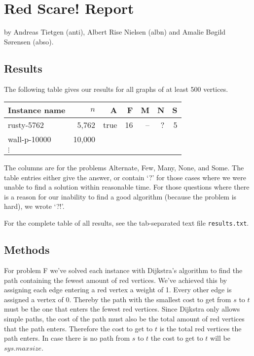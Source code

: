 \documentclass{tufte-handout}
\begin{document}
\section{Red Scare! Report}

by Andreas Tietgen (anti), Albert Rise Nielsen (albn) and Amalie Bøgild Sørensen (abso).

\subsection{Results}

The following table gives our results for all graphs of at least 500 vertices.

\medskip
\begin{tabular}{lrrrrrr}
  \toprule
  Instance name & $n$ & A & F & M & N & S \\
  \midrule
  rusty-5762 & 5,762 & true & 16 & -- & ? & 5 \\
  wall-p-10000 & 10,000 &\\	
  $\vdots$\\
  \bottomrule
\end{tabular}
\medskip

The columns are for the problems Alternate, Few, Many, None, and Some.
The table entries either give the answer, or contain `?' for those cases where we were unable to find a solution within reasonable time.
For those questions where there is a reason for our inability to find a good algorithm (because the problem is hard), we wrote `?!'.

For the complete table of all results, see the tab-separated text file {\tt results.txt}.

\subsection{Methods}

For problem F we've solved each instance with Dijkstra's algorithm to find the path containing the fewest amount of red vertices. We've achieved this by assigning each edge entering a red vertex a weight of 1. Every other edge is assigned a vertex of 0. Thereby the path with the smallest cost to get from $s$ to $t$ must be the one that enters the fewest red vertices. Since Dijkstra only allows simple paths, the cost of the path must also be the total amount of red vertices that the path enters. Therefore the cost to get to $t$ is the total red vertices the path enters. In case there is no path from $s$ to $t$ the cost to get to $t$ will be $sys.maxsize$.
\end{document}
